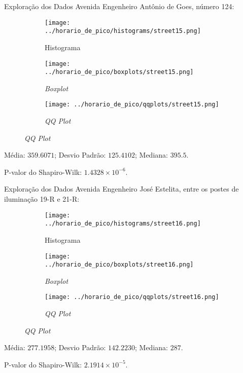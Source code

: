 \begin{frame}{Exploração dos Dados}
Avenida Engenheiro Antônio de Goes, número 124:
\vskip 0.05cm
\begin{figure}
	\centering
	\begin{subfigure}{.33\textwidth}
		\centering
		\texttt{[image: ../horario\_de\_pico/histograms/street15.png]}
		\caption*{Histograma}
	\end{subfigure}%
	\begin{subfigure}{.33\textwidth}
		\centering
		\texttt{[image: ../horario\_de\_pico/boxplots/street15.png]}
		\caption*{\textit{Boxplot}}
	\end{subfigure}
	\begin{subfigure}{.32\textwidth}
		\centering
		\texttt{[image: ../horario\_de\_pico/qqplots/street15.png]}
		\caption*{\textit{QQ Plot}}
	\end{subfigure}
\end{figure}
\vskip 0.05cm
Média: $359.6071$; Desvio Padrão: $125.4102$; Mediana: $395.5$.

P-valor do Shapiro-Wilk: $1.4328 \times 10^{-6}$.
\end{frame}

\begin{frame}{Exploração dos Dados}
Avenida Engenheiro José Estelita, entre os postes de iluminação 19-R e 21-R:
\begin{figure}
	\centering
	\begin{subfigure}{.33\textwidth}
		\centering
		\texttt{[image: ../horario\_de\_pico/histograms/street16.png]}
		\caption*{Histograma}
	\end{subfigure}%
	\begin{subfigure}{.33\textwidth}
		\centering
		\texttt{[image: ../horario\_de\_pico/boxplots/street16.png]}
		\caption*{\textit{Boxplot}}
	\end{subfigure}
	\begin{subfigure}{.32\textwidth}
		\centering
		\texttt{[image: ../horario\_de\_pico/qqplots/street16.png]}
		\caption*{\textit{QQ Plot}}
	\end{subfigure}
\end{figure}
Média: $277.1958$; Desvio Padrão: $142.2230$; Mediana: $287$.

P-valor do Shapiro-Wilk: $2.1914 \times 10^{-5}$.
\end{frame}

